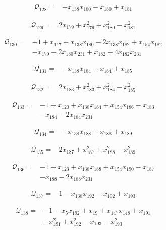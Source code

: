 \begin{align*}
\mathcal{Q}_{128}={}&-x_{138}x_{180}-x_{180}+x_{181}
\end{align*}

\begin{align*}
\mathcal{Q}_{129}={}&2x_{179}+x_{179}^{2}+x_{180}^{2}-x_{181}^{2}
\end{align*}

\begin{align*}
\mathcal{Q}_{130}={}&-1+x_{117}+x_{138}x_{180}-2x_{138}x_{182}+x_{154}x_{182}\\
&-x_{179}-2x_{180}x_{231}+x_{182}+4x_{182}x_{231}
\end{align*}

\begin{align*}
\mathcal{Q}_{131}={}&-x_{138}x_{184}-x_{184}+x_{185}
\end{align*}

\begin{align*}
\mathcal{Q}_{132}={}&2x_{183}+x_{183}^{2}+x_{184}^{2}-x_{185}^{2}
\end{align*}

\begin{align*}
\mathcal{Q}_{133}={}&-1+x_{120}+x_{138}x_{184}+x_{154}x_{186}-x_{183}\\
&-x_{184}-2x_{184}x_{231}
\end{align*}

\begin{align*}
\mathcal{Q}_{134}={}&-x_{138}x_{188}-x_{188}+x_{189}
\end{align*}

\begin{align*}
\mathcal{Q}_{135}={}&2x_{187}+x_{187}^{2}+x_{188}^{2}-x_{189}^{2}
\end{align*}

\begin{align*}
\mathcal{Q}_{136}={}&-1+x_{123}+x_{138}x_{188}+x_{154}x_{190}-x_{187}\\
&-x_{188}-2x_{188}x_{231}
\end{align*}

\begin{align*}
\mathcal{Q}_{137}={}&1-x_{138}x_{192}-x_{192}+x_{193}
\end{align*}

\begin{align*}
\mathcal{Q}_{138}={}&-1-x_{5}x_{192}+x_{19}+x_{147}x_{148}+x_{191}\\
&+x_{191}^{2}+x_{192}^{2}-x_{193}-x_{193}^{2}
\end{align*}

